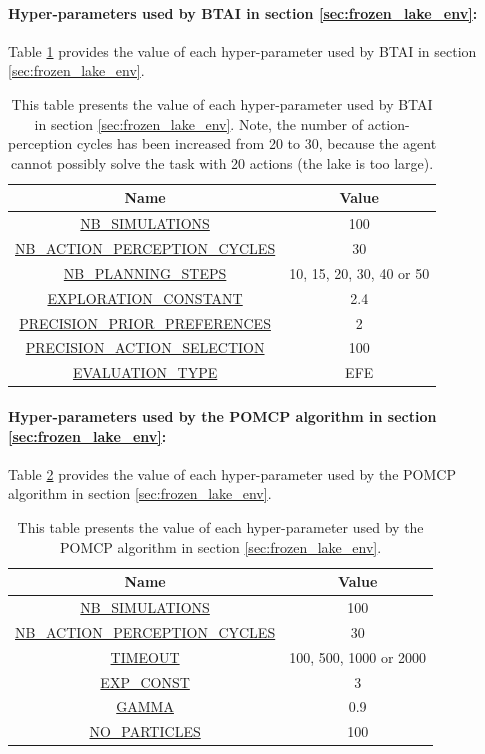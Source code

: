 \documentclass[twoside,11pt]{article}
\begin{document}
\paragraph{Hyper-parameters used by BTAI in section \ref{sec:frozen_lake_env}:}

Table \ref{tab:values_hp_frozen_lake_env} provides the value of each hyper-parameter used by BTAI in section \ref{sec:frozen_lake_env}.

\begin{table}[H]
\centering
\begin{tabular}{ |c|c|  }
 \hline
 Name & Value\\
 \hline
 \hline
 \url{NB_SIMULATIONS} & 100\\
 \hline
 \url{NB_ACTION_PERCEPTION_CYCLES} & 30\\
 \hline
 \url{NB_PLANNING_STEPS} & 10, 15, 20, 30, 40 or 50\\
 \hline
 \url{EXPLORATION_CONSTANT} & 2.4\\
 \hline
 \url{PRECISION_PRIOR_PREFERENCES} & 2\\
 \hline
 \url{PRECISION_ACTION_SELECTION} & 100\\
 \hline
 \url{EVALUATION_TYPE} & EFE\\
 \hline
\end{tabular}
\caption{This table presents the value of each hyper-parameter used by BTAI in section \ref{sec:frozen_lake_env}. Note, the number of action-perception cycles has been increased from 20 to 30, because the agent cannot possibly solve the task with 20 actions (the lake is too large).}
\label{tab:values_hp_frozen_lake_env}
\end{table}

\paragraph{Hyper-parameters used by the POMCP algorithm in section \ref{sec:frozen_lake_env}:}

Table \ref{tab:values_hp_frozen_lake_env_POMCP} provides the value of each hyper-parameter used by the POMCP algorithm in section \ref{sec:frozen_lake_env}.

\begin{table}[H]
\centering
\begin{tabular}{ |c|c|  }
 \hline
 Name & Value\\
 \hline
 \hline
 \url{NB_SIMULATIONS} & 100\\
 \hline
 \url{NB_ACTION_PERCEPTION_CYCLES} & 30\\
 \hline
 \url{TIMEOUT} & 100, 500, 1000 or 2000\\
 \hline
 \url{EXP_CONST} & 3\\
 \hline
 \url{GAMMA} & 0.9\\
 \hline
 \url{NO_PARTICLES} & 100\\
 \hline
\end{tabular}
\caption{This table presents the value of each hyper-parameter used by the POMCP algorithm in section \ref{sec:frozen_lake_env}.}
\label{tab:values_hp_frozen_lake_env_POMCP}
\end{table}
\end{document}
